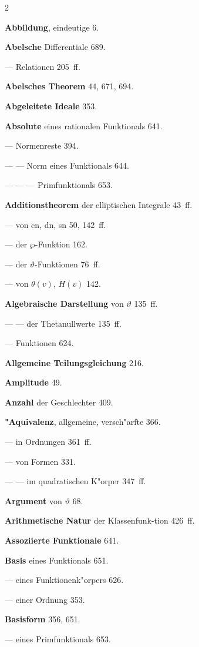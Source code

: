 \documentclass[12pt,a4paper]{article}
\begin{document}
\begin{multicols}{2}
\small
\setlength{\parindent}{0pt}
\setlength{\parskip}{2pt}

\textbf{Abbildung}, eindeutige 6.

\textbf{Abelsche} Differentiale 689.

--- Relationen 205~ff.

\textbf{Abelsches Theorem} 44, 671, 694.

\textbf{Abgeleitete Ideale} 353.

\textbf{Absolute} eines rationalen Funktionals 641.

--- Normenreste 394.

--- --- Norm eines Funktionals 644.

--- --- --- Primfunktionals 653.

\textbf{Additionstheorem} der elliptischen Integrale 43~ff.

--- von cn, dn, sn 50, 142~ff.

--- der $\wp$-Funktion 162.

--- der $\vartheta$-Funktionen 76~ff.

--- von $\theta(v)$, $H(v)$ 142.

\textbf{Algebraische Darstellung} von $\vartheta$ 135~ff.

--- --- der Thetanullwerte 135~ff.

--- Funktionen 624.

\textbf{Allgemeine Teilungsgleichung} 216.

\textbf{Amplitude} 49.

\textbf{Anzahl} der Geschlechter 409.

\textbf{"Aquivalenz}, allgemeine, versch"arfte 366.

--- in Ordnungen 361~ff.

--- von Formen 331.

--- --- im quadratischen K"orper 347~ff.

\textbf{Argument} von $\vartheta$ 68.

\textbf{Arithmetische Natur} der Klassenfunk{-}tion 426~ff.

\textbf{Assoziierte Funktionale} 641.

\bigskip

\textbf{Basis} eines Funktionals 651.

--- eines Funktionenk"orpers 626.

--- einer Ordnung 353.

\textbf{Basisform} 356, 651.

--- eines Primfunktionals 653.


\end{multicols}
\end{document}
